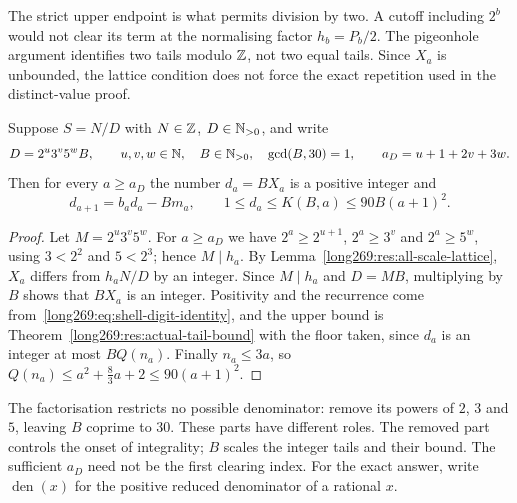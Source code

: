 \documentclass[11pt]{article}
\theoremstyle{remark}
\theoremstyle{plain}
\begin{document}
The strict upper endpoint is what permits division by two.  A cutoff
including $2^b$ would not clear its term at the normalising factor $h_b=P_b/2$.
The pigeonhole argument identifies two tails modulo $\mathbb{Z}$, not two equal
tails. Since $X_a$ is unbounded, the lattice condition does not force
the exact repetition used in the distinct-value proof.

\begin{theorem}
\label{long269:res:actual-cancellation}\label{long269:res:lead-carry-bridge}
\label{long269:res:actual-carry-bound}\label{long269:res:denominator-reduction}
Suppose $S=N/D$ with $N\in\mathbb{Z}$, $D\in\mathbb{N}_{>0}$, and write
\[
 D=2^{u}3^{v}5^{w}B,\qquad u,v,w\in\mathbb{N},\quad B\in\mathbb{N}_{>0},\quad\gcd(B,30)=1,
 \qquad a_D=u+1+2v+3w .
\]
Then for every $a\ge a_D$ the number $d_a=BX_a$ is a positive integer and
\[
 d_{a+1}=b_ad_a-Bm_a,\qquad 1\le d_a\le K(B,a)\le90B(a+1)^{2} .
\]
\end{theorem}

\begin{proof}
Let $M=2^{u}3^{v}5^{w}$.  For $a\ge a_D$ we have $2^{a}\ge2^{u+1}$,
$2^{a}\ge3^{v}$ and $2^{a}\ge5^{w}$, using $3<2^{2}$ and $5<2^{3}$; hence
$M\mid h_a$.  By Lemma~\ref{long269:res:all-scale-lattice}, $X_a$ differs from $h_aN/D$
by an integer.  Since $M\mid h_a$ and $D=MB$, multiplying by $B$ shows
that $BX_a$ is an integer.  Positivity and the
recurrence come from~\eqref{long269:eq:shell-digit-identity}, and the upper bound is
Theorem~\ref{long269:res:actual-tail-bound} with the floor taken, since $d_a$ is an
integer at most $BQ(n_a)$.  Finally $n_a\le3a$, so
$Q(n_a)\le a^{2}+\tfrac83a+2\le90(a+1)^{2}$.
\end{proof}

The factorisation restricts no possible denominator: remove its powers
of $2$, $3$ and $5$, leaving $B$ coprime to $30$. These parts have
different roles. The removed part controls the onset of integrality;
$B$ scales the integer tails and their bound. The sufficient $a_D$ need
not be the first clearing index. For the exact answer, write
$\operatorname{den}(x)$ for the positive reduced denominator of a rational $x$.
\end{document}
